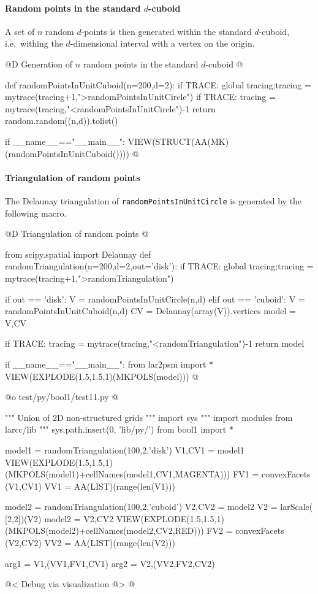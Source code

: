 \documentclass[11pt,oneside]{article}	%
\begin{document}
\paragraph{Random points in the standard $d$-cuboid} 
A set of $n$ random $d$-points is then generated within the standard $d$-cuboid, i.e.~withing the $d$-dimensional interval with a vertex on the origin.

@D Generation of $n$ random points in the standard $d$-cuboid 
@{def randomPointsInUnitCuboid(n=200,d=2):
	if TRACE: global tracing;tracing = mytrace(tracing+1,">randomPointsInUnitCircle")
	if TRACE: tracing = mytrace(tracing,"<randomPointsInUnitCircle")-1
	return random.random((n,d)).tolist()

if __name__=="__main__":
	VIEW(STRUCT(AA(MK)(randomPointsInUnitCuboid()))) 
@}



\paragraph{Triangulation of random points} The Delaunay triangulation of \texttt{randomPointsInUnitCircle} is generated by the following macro.


@D Triangulation of random points
@{from scipy.spatial import Delaunay
def randomTriangulation(n=200,d=2,out='disk'):
	if TRACE: global tracing;tracing = mytrace(tracing+1,">randomTriangulation")

	if out == 'disk':
		V = randomPointsInUnitCircle(n,d)
	elif out == 'cuboid':
		V = randomPointsInUnitCuboid(n,d)
	CV = Delaunay(array(V)).vertices
	model = V,CV

	if TRACE: tracing = mytrace(tracing,"<randomTriangulation")-1
	return model

if __name__=="__main__":
	from lar2psm import *
	VIEW(EXPLODE(1.5,1.5,1)(MKPOLS(model)))
@}



@o test/py/bool1/test11.py
@{""" Union of 2D non-structured grids """
import sys
""" import modules from larcc/lib """
sys.path.insert(0, 'lib/py/')
from bool1 import *

model1 = randomTriangulation(100,2,'disk')
V1,CV1 = model1
VIEW(EXPLODE(1.5,1.5,1)(MKPOLS(model1)+cellNames(model1,CV1,MAGENTA)))
FV1 = convexFacets (V1,CV1)
VV1 = AA(LIST)(range(len(V1)))

model2 = randomTriangulation(100,2,'cuboid')
V2,CV2 = model2
V2 = larScale( [2,2])(V2)
model2 = V2,CV2 
VIEW(EXPLODE(1.5,1.5,1)(MKPOLS(model2)+cellNames(model2,CV2,RED)))
FV2 = convexFacets (V2,CV2)
VV2 = AA(LIST)(range(len(V2)))

arg1 = V1,(VV1,FV1,CV1)
arg2 = V2,(VV2,FV2,CV2)

@< Debug via visualization @>
@}
\end{document}
